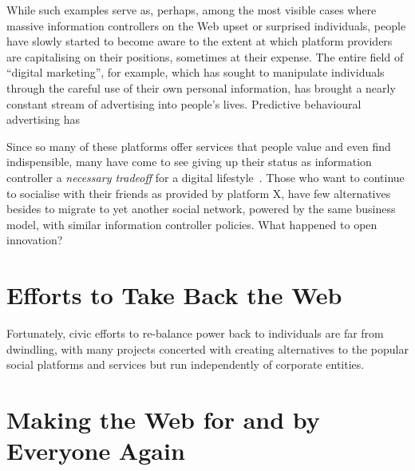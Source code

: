 \documentclass{amsart}
\begin{document}
While such examples serve as, perhaps, among the most visible cases where massive information controllers on the Web upset or surprised individuals,  people have slowly started to become aware to the extent at which platform providers are capitalising on their positions, sometimes at their expense.  The entire field of ``digital marketing'', for example, which has sought to manipulate individuals through the careful use of their own personal information, has brought a nearly constant stream of advertising into people's lives.  Predictive behavioural advertising has 

Since so many of these platforms offer services that people value and even find indispensible, many have come to see giving up their status as information controller a \emph{necessary tradeoff} for a digital lifestyle~\cite{}. Those who want to continue to socialise with their friends as provided by platform X, have few alternatives besides to migrate to yet another social network, powered by the same business model, with similar information controller policies.  What happened to open innovation? 

\section{Efforts to Take Back the Web}

Fortunately, civic efforts to re-balance power back to individuals are far from dwindling, with many projects concerted with creating alternatives to the popular social platforms and services but run independently of corporate entities.  

\section{Making the Web for and by Everyone Again}





\end{document}
